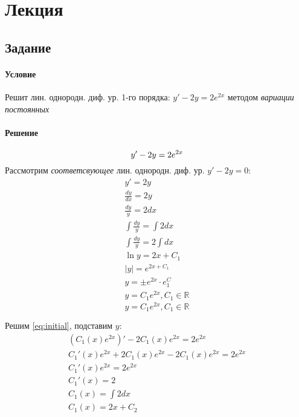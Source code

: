 \section{Лекция}

\subsection{Задание }
\paragraph{Условие}
Решит лин. однородн. диф. ур. 1-го порядка: $y' - 2y = 2e^{2x}$ методом \textit{вариации постоянных}
\paragraph{Решение}
\begin{equation} \label{eq:initial}
	y' - 2y = 2e^{2x} \\
\end{equation}
Рассмотрим \textit{соответсвующее} лин. однородн. диф. ур. $y' - 2y = 0$:
\begin{gather*}
	y' = 2y \\
	\frac{dy}{dx} = 2y \\
	\frac{dy}{y} = 2dx \\
	\int \frac{dy}{y} = \int 2dx \\
	\int \frac{dy}{y} = 2\int dx \\
	\ln{y} = 2x + C_1 \\
	\lvert y \rvert = e^{2x+C_1} \\
	y = \pm e^{2x} \cdot e^C_1 \\
	y = C_1e^{2x}, C_1 \in \mathbb{R}
\end{gather*}
\begin{equation}
	y = C_1e^{2x}, C_1 \in \mathbb{R}
	\label{eq:partial}
\end{equation}

Решим \ref{eq:initial}, подставим $y$:
\begin{gather*}
	(C_1(x)e^{2x})' - 2C_1(x)e^{2x} = 2e^{2x} \\
	C_1'(x)e^{2x} + 2C_1(x)e^{2x} - 2C_1(x)e^{2x} = 2e^{2x} \\
	C_1'(x)e^{2x} = 2e^{2x} \\
	C_1'(x) = 2 \\
	C_1(x) = \int2dx \\
	C_1(x) = 2x  + C_2 \\
\end{gather*}

